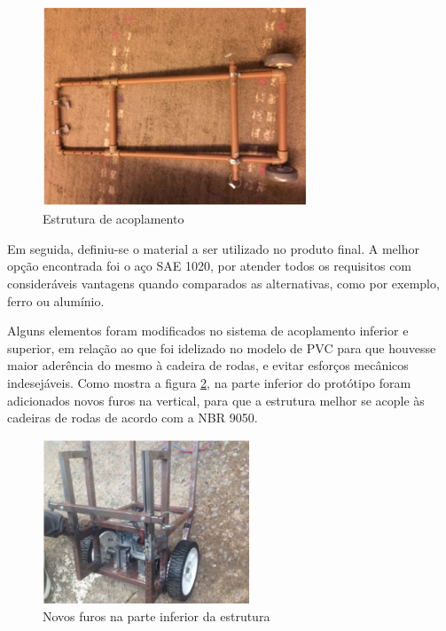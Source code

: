 \begin{figure}[!ht]
\centering
\includegraphics[width=0.7\textwidth]{figuras/resultados/acoplamento}
\caption{Estrutura de acoplamento}
\label{fig:acoplamento}
\end{figure}

Em seguida, definiu-se o material a ser utilizado no produto final. A melhor opção encontrada foi o aço SAE 1020, por atender todos os requisitos com consideráveis vantagens quando comparados as alternativas, como por exemplo, ferro ou alumínio.

Alguns elementos foram modificados no sistema de acoplamento inferior e superior, em relação ao que foi idelizado no modelo de PVC para que houvesse maior aderência do mesmo à cadeira de rodas, e evitar esforços mecânicos indesejáveis. Como mostra a figura \ref{fig:furos_estrutura}, na parte inferior do protótipo foram adicionados novos furos na vertical, para que a estrutura melhor se acople às cadeiras de rodas de acordo com a NBR 9050.

\begin{figure}[!htb]
\centering
\includegraphics[width=0.55\textwidth]{figuras/resultados/furos_estrutura}
\caption{Novos furos na parte inferior da estrutura}
\label{fig:furos_estrutura}
\end{figure}

